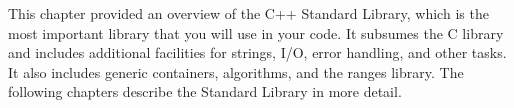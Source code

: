 This chapter provided an overview of the C++ Standard Library, which is the most important library that you will use in your code. It subsumes the C library and includes additional facilities for strings, I/O, error handling, and other tasks. It also includes generic containers, algorithms, and the ranges library. The following chapters describe the Standard Library in more detail.